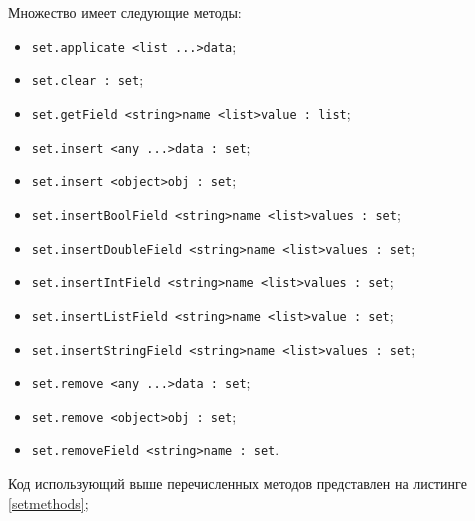 \documentclass[a4paper, 14pt]{extarticle}
\newenvironment{icItems}
	{ \begin{itemize} [noitemsep,nolistsep] }
	{ \end{itemize} }
\begin{document}
Множество имеет следующие методы:
\begin{icItems}
\item \lstinline|set.applicate <list ...>data|;
\item \lstinline|set.clear : set|;
\item \lstinline|set.getField <string>name <list>value : list|;
\item \lstinline|set.insert <any ...>data : set|;
\item \lstinline|set.insert <object>obj : set|;
\item \lstinline|set.insertBoolField <string>name <list>values : set|;
\item \lstinline|set.insertDoubleField <string>name <list>values : set|;
\item \lstinline|set.insertIntField <string>name <list>values : set|;
\item \lstinline|set.insertListField <string>name <list>value : set|;
\item \lstinline|set.insertStringField <string>name <list>values : set|;
\item \lstinline|set.remove <any ...>data : set|;
\item \lstinline|set.remove <object>obj : set|;
\item \lstinline|set.removeField <string>name : set|.
\end{icItems}

Код использующий выше перечисленных методов представлен на листинге \ref{setmethods};
\end{document}
